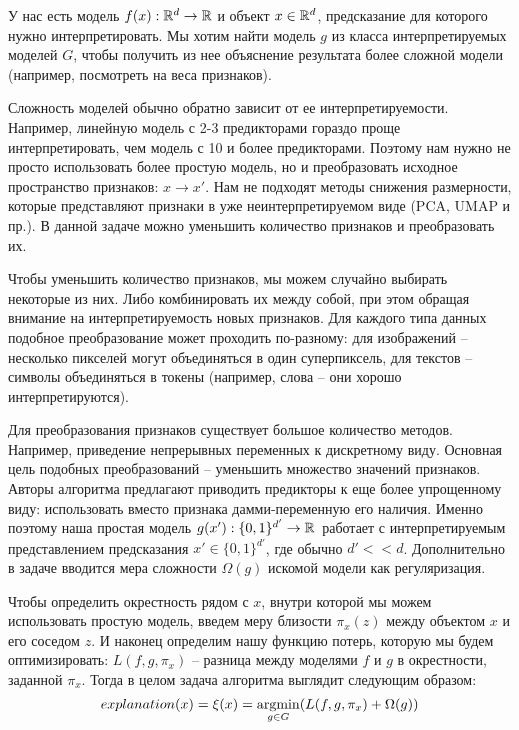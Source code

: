 У нас есть модель $f(x): \mathbb{R}^d \rightarrow \mathbb{R}$ и объект $x \in \mathbb{R}^d$, предсказание для которого нужно интерпретировать. Мы хотим найти модель $g$ из класса интерпретируемых моделей $G$, чтобы получить из нее объяснение результата более сложной модели (например, посмотреть на веса признаков).

Сложность моделей обычно обратно зависит от ее интерпретируемости. Например, линейную модель с 2-3 предикторами гораздо проще интерпретировать, чем модель с 10 и более предикторами. Поэтому нам нужно не просто использовать более простую модель, но и преобразовать исходное пространство признаков: $x \rightarrow x'$. Нам не подходят методы снижения размерности, которые представляют признаки в уже неинтерпретируемом виде (PCA, UMAP и пр.). В данной задаче можно уменьшить количество признаков и преобразовать их.

Чтобы уменьшить количество признаков, мы можем случайно выбирать некоторые из них. Либо комбинировать их между собой, при этом обращая внимание на интерпретируемость новых признаков. Для каждого типа данных подобное преобразование может проходить по-разному: для изображений -- несколько пикселей могут объединяться в один суперпиксель, для текстов -- символы объединяться в токены (например, слова -- они хорошо интерпретируются).

Для преобразования признаков существует большое количество методов. Например, приведение непрерывных переменных к дискретному виду. Основная цель подобных преобразований -- уменьшить множество значений признаков. Авторы алгоритма предлагают приводить предикторы к еще более упрощенному виду: использовать вместо признака дамми-переменную его наличия. Именно поэтому наша простая модель $g(x'):\{0,1\}^{d'} \rightarrow \mathbb{R}\,$ работает с интерпретируемым представлением предсказания $x' \in \{0,1\}^{d'}$, где обычно $d' << d$.
Дополнительно в задаче вводится мера сложности $\Omega(g)$ искомой модели как регуляризация. %

Чтобы определить окрестность рядом с $x$, внутри которой мы можем использовать простую модель, введем меру близости $\pi_x(z)$ между объектом $x$ и его соседом $z$. И наконец определим нашу функцию потерь, которую мы будем оптимизировать: $L(f, g, \pi_x)$ -- разница между моделями $f$ и $g$ в окрестности, заданной $\pi_x$. Тогда в целом задача алгоритма выглядит следующим образом:
\[
explanation(x) = \xi(x) = \underset{g \in G}{\operatorname{argmin}} (L(f, g, \pi_x) + \Omega(g))
\]

